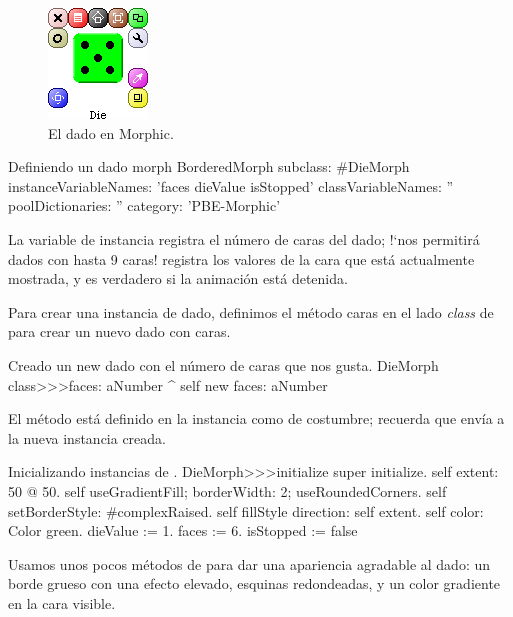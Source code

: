 \documentclass[a4paper,10pt,twoside]{book}
\begin{document}
\begin{figure}[ht]
	\centerline{\includegraphics[scale=0.65]{die}}
	\caption{El dado en Morphic.
		}
\end{figure}


\begin{classdef}{Definiendo un dado morph}
BorderedMorph subclass: #DieMorph
	instanceVariableNames: 'faces dieValue isStopped'
	classVariableNames: ''
	poolDictionaries: ''
	category: 'PBE-Morphic'
\end{classdef}

La variable de instancia  registra el n\'umero de caras del dado; !`nos permitir\'a dados con hasta 9 caras!  registra los valores de la cara que est\'a actualmente mostrada, y  es verdadero si la animaci\'on est\'a detenida.

Para crear una instancia de dado, definimos el m\'etodo caras en el lado \emph{class}  de  para crear un nuevo dado con  caras.

\begin{method}{Creado un new dado con el n\'umero de caras que nos gusta.}
DieMorph class>>>faces: aNumber
	^ self new faces: aNumber
\end{method}

El m\'etodo  est\'a definido en la instancia como de costumbre; recuerda que  env\'ia  a la nueva instancia creada.
\begin{method}{Inicializando instancias de .}
DieMorph>>>initialize
	super initialize.
	self extent: 50 @ 50.
	self useGradientFill; borderWidth: 2; useRoundedCorners.
	self setBorderStyle: #complexRaised.
	self fillStyle direction: self extent.
	self color: Color green.
	dieValue := 1.
	faces := 6.
	isStopped := false
\end{method}

Usamos unos pocos m\'etodos de   para dar una apariencia agradable al dado: un borde grueso con una efecto elevado, esquinas redondeadas, y un color gradiente en la cara visible.
\end{document}
